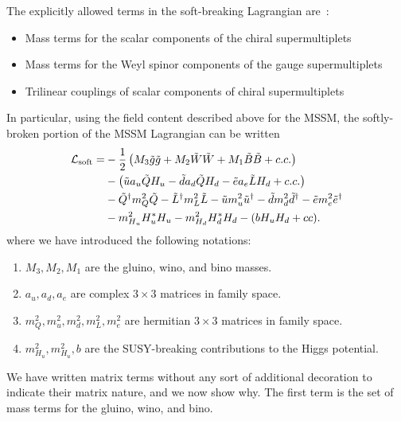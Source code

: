 The explicitly allowed terms in the soft-breaking Lagrangian are~\cite{archilSUSYLectures}:
\begin{itemize}
\item Mass terms for the scalar components of the chiral supermultiplets
\item Mass terms for the Weyl spinor components of the gauge supermultiplets
\item Trilinear couplings of scalar components of chiral supermultiplets
\end{itemize}
In particular, using the field content described above for the MSSM, the softly-broken portion of the MSSM Lagrangian can be written
\begin{align}
\mathcal{L}_{\text{soft}} = &-\frac{1}{2}\begin{pmatrix} M_3 \tilde{g} \tilde{g} + M_2 \tilde{W} \tilde{W} + M_1 \tilde{B} \tilde{B} + c.c. \end{pmatrix} \\
                    &-\begin{pmatrix} \tilde{u} a_u \tilde{Q} H_u - \tilde{d} a_d \tilde{Q} H_d - \tilde{e} a_e \tilde{L} H_d + c.c. \end{pmatrix} \\
                    &- \tilde{Q}^\dagger m_Q^2 \tilde{Q} - \tilde{L}^\dagger m_L^2 \tilde{L} - \tilde{u} m_u^2 \tilde{u}^\dagger - \tilde{d} m_d^2 \tilde{d}^\dagger - \tilde{e} m_e^2 \tilde{e}^\dagger \\
                    &- m^2_{H_u} H_u^* H_u - m^2_{H_d} H_d^* H_d - (b H_u H_d + cc).
\end{align}
where we have introduced the following notations:
\begin{enumerate}
\item $M_3,M_2,M_1$ are the gluino, wino, and bino masses. \label{list:gaugino_masses}
\item $a_u,a_d,a_e$  are complex $3 \times 3$ matrices in family space. \label{list:yukawa_couplings}
\item $m_Q^2 , m_u^2, m_d^2, m_L^2,m_e^2 $ are hermitian  $3 \times 3$ matrices in family space. \label{list:flavor_changing}
\item $m_{H_u}^2, m_{H_u}^2, b$ are the SUSY-breaking contributions to the Higgs potential. \label{list:higgs}
\end{enumerate}
We have written matrix terms without any sort of additional decoration to indicate their matrix nature, and we now show why.
The first term  is the set of mass terms for the gluino, wino, and bino.
